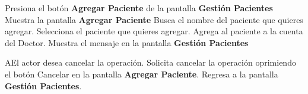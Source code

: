  \begin{UCtrayectoria}
 	
 	\UCpaso [\UCactor] Presiona el botón \textbf{Agregar Paciente} de la pantalla \textbf{Gestión Pacientes}
 	\UCpaso Muestra la pantalla \textbf{Agregar Paciente}
 	\UCpaso [\UCactor] Busca el nombre del paciente que quieres agregar.
 	\UCpaso [\UCactor] Selecciona el paciente que quieres agregar.
 	\UCpaso Agrega al paciente a la cuenta del Doctor.
 	\UCpaso Muestra el mensaje  en la pantalla \textbf{Gestión Pacientes} 
 	
 \end{UCtrayectoria}

\begin{UCtrayectoriaA}{A}{El actor desea cancelar la operación.}
	\UCpaso[\UCactor] Solicita cancelar la operación oprimiendo el botón Cancelar en la pantalla \textbf{Agregar Paciente}.
	\UCpaso Regresa a la pantalla \textbf{Gestión Pacientes}.
\end{UCtrayectoriaA}

%
